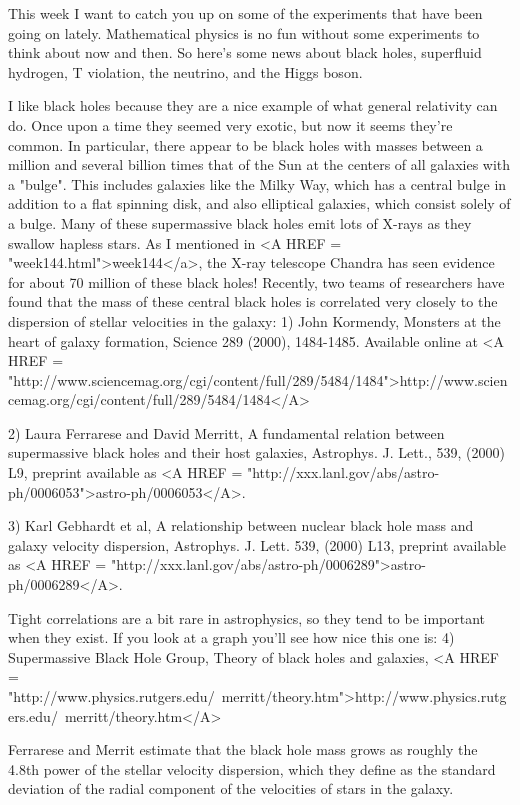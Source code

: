


This week I want to catch you up on some of the experiments that have
been going on lately.  Mathematical physics is no fun without some 
experiments to think about now and then.  So here's some news about 
black holes, superfluid hydrogen, T violation, the \tau  neutrino, and 
the Higgs boson.  

I like black holes because they are a nice example of what general
relativity can do.  Once upon a time they seemed very exotic, but now 
it seems they're common.  In particular, there appear to be black holes
with masses between a million and several billion times that of the Sun
at the centers of all galaxies with a "bulge".  This includes galaxies
like the Milky Way, which has a central bulge in addition to a flat
spinning disk, and also elliptical galaxies, which consist solely of a
bulge.  Many of these supermassive black holes emit lots of X-rays
as they swallow hapless stars.  As I mentioned in <A HREF = "week144.html">week144</a>, the X-ray 
telescope Chandra has seen evidence for about 70 million of these
black holes! 
Recently, two teams of researchers have found that the mass of these
central black holes is correlated very closely to the dispersion of 
stellar velocities in the galaxy:
1) John Kormendy, Monsters at the heart of galaxy formation, 
Science 289 (2000), 1484-1485.  Available online at 
<A HREF = "http://www.sciencemag.org/cgi/content/full/289/5484/1484">http://www.sciencemag.org/cgi/content/full/289/5484/1484</A>

2) Laura Ferrarese and David Merritt, A fundamental relation between 
supermassive black holes and their host galaxies, 
Astrophys. J. Lett., 539, (2000) L9, preprint available as
<A HREF = "http://xxx.lanl.gov/abs/astro-ph/0006053">astro-ph/0006053</A>.

3) Karl Gebhardt et al, A relationship between nuclear black hole 
mass and galaxy velocity dispersion, Astrophys. J. Lett. 539, (2000) L13, 
preprint available as
<A HREF = "http://xxx.lanl.gov/abs/astro-ph/0006289">astro-ph/0006289</A>.

Tight correlations are a bit rare in astrophysics, so they tend 
to be important when they exist.  If you look at a graph you'll see 
how nice this one is:
4) Supermassive Black Hole Group, Theory of black holes
and galaxies, <A HREF = "http://www.physics.rutgers.edu/~merritt/theory.htm">http://www.physics.rutgers.edu/~merritt/theory.htm</A>

Ferrarese and Merrit estimate that the black hole mass grows as 
roughly the 4.8th power of the stellar velocity dispersion, which
they define as the standard deviation of the radial component of 
the velocities of stars in the galaxy.  

